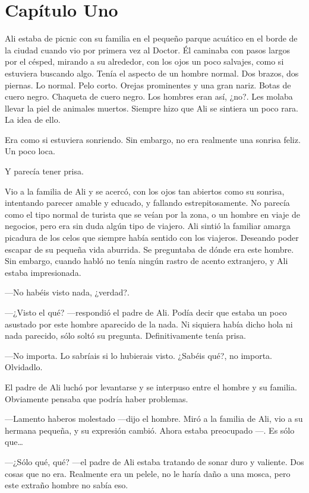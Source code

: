 \chapter*{Capítulo Uno}


Ali estaba de picnic con su familia en el pequeño parque acuático en el
borde de la ciudad cuando vio por primera vez al Doctor. Él caminaba con
pasos largos por el césped, mirando a su alrededor, con los ojos un poco
salvajes, como si estuviera buscando algo. Tenía el aspecto de un hombre
normal. Dos brazos, dos piernas. Lo normal. Pelo corto. Orejas
prominentes y una gran nariz. Botas de cuero negro. Chaqueta de cuero
negro. Los hombres eran así, ¿no?. Les molaba llevar la piel de animales
muertos. Siempre hizo que Ali se sintiera un poco rara. La idea de ello.

Era como si estuviera sonriendo. Sin embargo, no era realmente una
sonrisa feliz. Un poco loca.

Y parecía tener prisa.

Vio a la familia de Ali y se acercó, con los ojos tan abiertos como su
sonrisa, intentando parecer amable y educado, y fallando
estrepitosamente. No parecía como el tipo normal de turista que se veían
por la zona, o un hombre en viaje de negocios, pero era sin duda algún
tipo de viajero. Ali sintió la familiar amarga picadura de los celos que
siempre había sentido con los viajeros. Deseando poder escapar de su
pequeña vida aburrida. Se preguntaba de dónde era este hombre. Sin
embargo, cuando habló no tenía ningún rastro de acento extranjero, y Ali
estaba impresionada.

---No habéis visto nada, ¿verdad?.

---¿Visto el qué? ---respondió el padre de Ali. Podía decir que estaba
un poco asustado por este hombre aparecido de la nada. Ni siquiera había
dicho hola ni nada parecido, sólo soltó su pregunta. Definitivamente
tenía prisa.

---No importa. Lo sabríais si lo hubierais visto. ¿Sabéis qué?, no
importa. Olvidadlo.

El padre de Ali luchó por levantarse y se interpuso entre el hombre y su
familia. Obviamente pensaba que podría haber problemas.

---Lamento haberos molestado ---dijo el hombre. Miró a la familia de
Ali, vio a su hermana pequeña, y su expresión cambió. Ahora estaba
preocupado ---. Es sólo que\ldots{}

---¿Sólo qué, qué? ---el padre de Ali estaba tratando de sonar duro y
valiente. Dos cosas que no era. Realmente era un pelele, no le haría
daño a una mosca, pero este extraño hombre no sabía eso.

